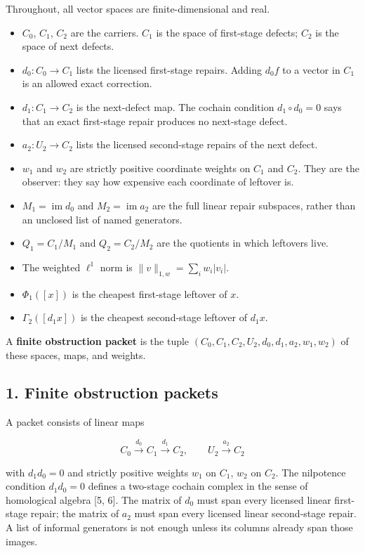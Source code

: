 \documentclass[
  11pt,
]{article}
\providecommand{\tightlist}{%
  \setlength{\itemsep}{0pt}\setlength{\parskip}{0pt}}
\begin{document}
Throughout, all vector spaces are finite-dimensional and real.

\begin{itemize}
\tightlist
\item
  \(C_0\), \(C_1\), \(C_2\) are the carriers. \(C_1\) is the space of first-stage defects; \(C_2\) is the space of next defects.
\item
  \(d_0\colon C_0\to C_1\) lists the licensed first-stage repairs. Adding \(d_0 f\) to a vector in \(C_1\) is an allowed exact correction.
\item
  \(d_1\colon C_1\to C_2\) is the next-defect map. The cochain condition \(d_1\circ d_0=0\) says that an exact first-stage repair produces no next-stage defect.
\item
  \(a_2\colon U_2\to C_2\) lists the licensed second-stage repairs of the next defect.
\item
  \(w_1\) and \(w_2\) are strictly positive coordinate weights on \(C_1\) and \(C_2\). They are the observer: they say how expensive each coordinate of leftover is.
\item
  \(M_1=\operatorname{im} d_0\) and \(M_2=\operatorname{im} a_2\) are the full linear repair subspaces, rather than an unclosed list of named generators.
\item
  \(Q_1=C_1/M_1\) and \(Q_2=C_2/M_2\) are the quotients in which leftovers live.
\item
  The weighted \(\ell^1\) norm is \(\|v\|_{1,w}=\sum_i w_i|v_i|\).
\item
  \(\Phi_1([x])\) is the cheapest first-stage leftover of \(x\).
\item
  \(\Gamma_2([d_1 x])\) is the cheapest second-stage leftover of \(d_1 x\).
\end{itemize}

A \textbf{finite obstruction packet} is the tuple \((C_0,C_1,C_2,U_2,d_0,d_1,a_2,w_1,w_2)\) of these spaces, maps, and weights.

\subsection{1. Finite obstruction packets}\label{finite-obstruction-packets}

A packet consists of linear maps

\[
C_0\xrightarrow{d_0} C_1\xrightarrow{d_1} C_2, \qquad U_2\xrightarrow{a_2} C_2
\]

with \(d_1 d_0=0\) and strictly positive weights \(w_1\) on \(C_1\), \(w_2\) on \(C_2\). The nilpotence condition \(d_1 d_0=0\) defines a two-stage cochain complex in the sense of homological algebra {[}5, 6{]}. The matrix of \(d_0\) must span every licensed linear first-stage repair; the matrix of \(a_2\) must span every licensed linear second-stage repair. A list of informal generators is not enough unless its columns already span those images.
\end{document}
